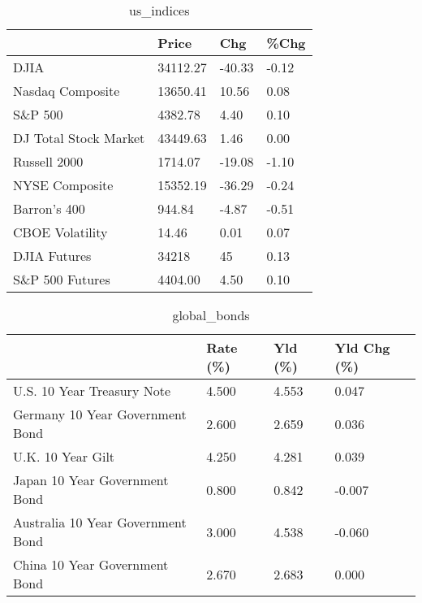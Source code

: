\documentclass{article}%
\begin{document}
%


\begin{table}[htbp]%
\caption{us\_indices}%
\centering%
\begin{adjustbox}{width=1\textwidth}%
\begin{tabular}{llll}
\toprule
                      &    Price &    Chg &  \%Chg \\
\midrule
                 DJIA & 34112.27 & -40.33 & -0.12 \\
     Nasdaq Composite & 13650.41 &  10.56 &  0.08 \\
              S\&P 500 &  4382.78 &   4.40 &  0.10 \\
DJ Total Stock Market & 43449.63 &   1.46 &  0.00 \\
         Russell 2000 &  1714.07 & -19.08 & -1.10 \\
       NYSE Composite & 15352.19 & -36.29 & -0.24 \\
         Barron's 400 &   944.84 &  -4.87 & -0.51 \\
      CBOE Volatility &    14.46 &   0.01 &  0.07 \\
         DJIA Futures &    34218 &     45 &  0.13 \\
      S\&P 500 Futures &  4404.00 &   4.50 &  0.10 \\
\bottomrule
\end{tabular}
%
\end{adjustbox}%
\end{table}

%


\begin{table}[htbp]%
\caption{global\_bonds}%
\centering%
\begin{adjustbox}{width=1\textwidth}%
\begin{tabular}{llll}
\toprule
                                  & Rate (\%) & Yld (\%) & Yld Chg (\%) \\
\midrule
       U.S. 10 Year Treasury Note &    4.500 &   4.553 &       0.047 \\
  Germany 10 Year Government Bond &    2.600 &   2.659 &       0.036 \\
                U.K. 10 Year Gilt &    4.250 &   4.281 &       0.039 \\
    Japan 10 Year Government Bond &    0.800 &   0.842 &      -0.007 \\
Australia 10 Year Government Bond &    3.000 &   4.538 &      -0.060 \\
    China 10 Year Government Bond &    2.670 &   2.683 &       0.000 \\
\bottomrule
\end{tabular}
%
\end{adjustbox}%
\end{table}
\end{document}
